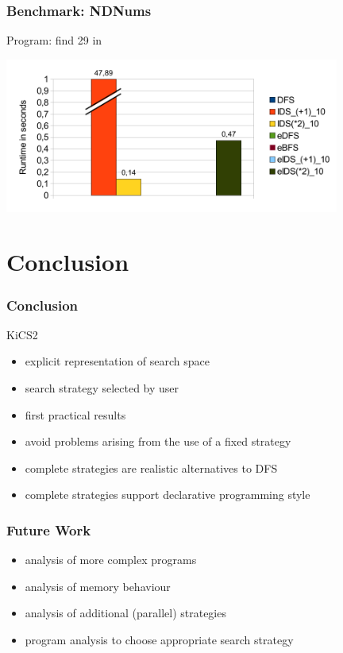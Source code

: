 \documentclass[
,hyperref={pdfpagelabels=false}
]{beamer}
\newcommand{\todo}[1]{\fbox{\sc To do: #1}}
\begin{document}
\begin{frame}[fragile]%
\frametitle{Benchmark: NDNums}
Program: find 29 in 
\begin{center}
\includegraphics[width=11cm]{gfx/ndnums}
\end{center}
\end{frame}

\section{Conclusion}

\begin{frame}[fragile]%
\frametitle{Conclusion}

\begin{block}{KiCS2}
\begin{itemize}
\item explicit representation of search space
\item search strategy selected by user
\item first practical results
\item avoid problems arising from the use of a fixed strategy
\item complete strategies are realistic alternatives to DFS
\item complete strategies support declarative programming style
\end{itemize}
\end{block}

\end{frame}

\begin{frame}[fragile]%
\frametitle{Future Work}

\begin{itemize}
\item analysis of more complex programs
\item analysis of memory behaviour
\item analysis of additional (parallel) strategies
\item program analysis to choose appropriate search strategy
\end{itemize}

\end{frame}
\end{document}
